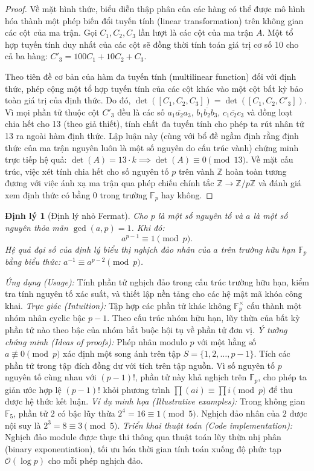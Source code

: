 \documentclass{article}
\newtheorem{dinhly}{Định lý}
\begin{document}
\begin{proof}
Về mặt hình thức, biểu diễn thập phân của các hàng có thể được mô hình hóa thành một phép biến đổi tuyến tính (linear transformation) trên không gian các cột của ma trận. Gọi $C_1, C_2, C_3$ lần lượt là các cột của ma trận $A$. Một tổ hợp tuyến tính duy nhất của các cột sẽ đồng thời tính toán giá trị cơ số 10 cho cả ba hàng: $C'_3 = 100 C_1 + 10 C_2 + C_3$.

Theo tiên đề cơ bản của hàm đa tuyến tính (multilinear function) đối với định thức, phép cộng một tổ hợp tuyến tính của các cột khác vào một cột bất kỳ bảo toàn giá trị của định thức. Do đó, $\det([C_1, C_2, C_3]) = \det([C_1, C_2, C'_3])$. Vì mọi phần tử thuộc cột $C'_3$ đều là các số $\overline{a_1a_2a_3}$, $\overline{b_1b_2b_3}$, $\overline{c_1c_2c_3}$ và đồng loạt chia hết cho 13 (theo giả thiết), tính chất đa tuyến tính cho phép ta rút nhân tử 13 ra ngoài hàm định thức. Lập luận này (cùng với bổ đề ngầm định rằng định thức của ma trận nguyên luôn là một số nguyên do cấu trúc vành) chứng minh trực tiếp hệ quả: $\det(A) = 13 \cdot k \implies \det(A) \equiv 0 \pmod{13}$. Về mặt cấu trúc, việc xét tính chia hết cho số nguyên tố $p$ trên vành $\mathbb{Z}$ hoàn toàn tương đương với việc ánh xạ ma trận qua phép chiếu chính tắc $\mathbb{Z} \to \mathbb{Z}/p\mathbb{Z}$ và đánh giá xem định thức có bằng $0$ trong trường $\mathbb{F}_p$ hay không.
\end{proof}

\begin{dinhly}[Định lý nhỏ Fermat]
Cho $p$ là một số nguyên tố và $a$ là một số nguyên thỏa mãn $\gcd(a, p) = 1$. Khi đó:
\[ a^{p-1} \equiv 1 \pmod p. \]
Hệ quả đại số của định lý biểu thị nghịch đảo nhân của $a$ trên trường hữu hạn $\mathbb{F}_p$ bằng biểu thức: $a^{-1} \equiv a^{p-2} \pmod p$.
\end{dinhly}
\emph{Ứng dụng (Usage):} Tính phần tử nghịch đảo trong cấu trúc trường hữu hạn, kiểm tra tính nguyên tố xác suất, và thiết lập nền tảng cho các hệ mật mã khóa công khai.
\emph{Trực giác (Intuition):} Tập hợp các phần tử khác không $\mathbb{F}_p^{\times}$ cấu thành một nhóm nhân cyclic bậc $p-1$. Theo cấu trúc nhóm hữu hạn, lũy thừa của bất kỳ phần tử nào theo bậc của nhóm bắt buộc hội tụ về phần tử đơn vị.
\emph{Ý tưởng chứng minh (Ideas of proofs):} Phép nhân modulo $p$ với một hằng số $a \not\equiv 0 \pmod p$ xác định một song ánh trên tập $S = \{1, 2, \dots, p-1\}$. Tích các phần tử trong tập đích đồng dư với tích trên tập nguồn. Vì số nguyên tố $p$ nguyên tố cùng nhau với $(p-1)!$, phần tử này khả nghịch trên $\mathbb{F}_p$, cho phép ta giản ước hợp lệ $(p-1)!$ khỏi phương trình $\prod (ai) \equiv \prod i \pmod p$ để thu được hệ thức kết luận.
\emph{Ví dụ minh họa (Illustrative examples):} Trong không gian $\mathbb{F}_5$, phần tử $2$ có bậc lũy thừa $2^4 = 16 \equiv 1 \pmod 5$. Nghịch đảo nhân của $2$ được nội suy là $2^3 = 8 \equiv 3 \pmod 5$.
\emph{Triển khai thuật toán (Code implementation):} Nghịch đảo module được thực thi thông qua thuật toán lũy thừa nhị phân (binary exponentiation), tối ưu hóa thời gian tính toán xuống độ phức tạp $\mathcal{O}(\log p)$ cho mỗi phép nghịch đảo.
\end{document}

